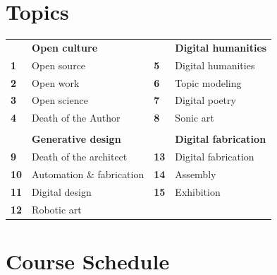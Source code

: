 \documentclass[11pt,article,oneside]{memoir}
\begin{document}
\section{Topics}
%
\begin{table}[H]
\begin{tabular}{l l @{\hskip 2cm} l l}
\small
\vspace*{0.25cm}
& \textbf{Open culture} && \textbf{Digital humanities} \\
\textbf{1} & Open source & \textbf{5} & Digital humanities \\
\textbf{2} & Open work & \textbf{6} & Topic modeling \\
\textbf{3} & Open science & \textbf{7} & Digital poetry \\
\textbf{4} & Death of the Author & \textbf{8} & Sonic art \\
\\
\vspace*{0.25cm}
& \textbf{Generative design} && \textbf{Digital fabrication} \\
\textbf{9} & Death of the architect & \textbf{13} & Digital fabrication \\
\textbf{10} & Automation \& fabrication & \textbf{14} & Assembly\\
 \textbf{11} & Digital design & \textbf{15} & Exhibition\\
 \textbf{12} & Robotic art\\
%
\end{tabular}
\end{table}

\clearpage

\section{Course Schedule}
\end{document}
